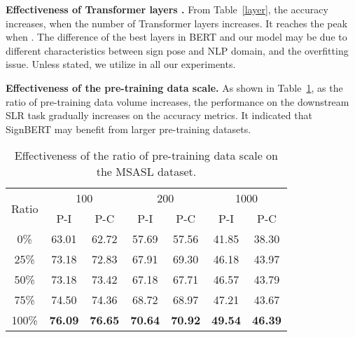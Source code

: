 \documentclass[10pt,twocolumn,letterpaper]{article}
\begin{document}
\noindent \textbf{Effectiveness of Transformer layers .}
From Table~\ref{layer}, the accuracy increases, when the number of Transformer layers increases.
It reaches the peak when .
The difference of the best layers in BERT and our model may be due to different characteristics between sign pose and NLP domain, and the overfitting issue.
Unless stated, we utilize  in all our experiments.


\noindent \textbf{Effectiveness of the pre-training data scale.}
As shown in Table~\ref{data-scale}, as the ratio of pre-training data volume increases, the performance on the downstream SLR task gradually increases on the accuracy metrics.
It indicated that SignBERT may benefit from larger pre-training datasets.


\begin{table}[t]
\small
\tabcolsep=5pt
\begin{center}
\begin{tabular}{c|cc|cc|cc}
\hline
\multicolumn{1}{c|}{\multirow{2}{*}{Ratio}} & \multicolumn{2}{c|}{100} & \multicolumn{2}{c|}{200} & \multicolumn{2}{c}{1000} \\
           & P-I & P-C & P-I   & P-C   & P-I   & P-C   \\ \hline \hline
0\%  & 63.01 & 62.72 & 57.69 & 57.56 & 41.85 & 38.30  \\
25\% & 73.18 & 72.83 & 67.91 & 69.30 & 46.18 & 43.97  \\
50\% & 73.18 & 73.42 & 67.18 & 67.71 & 46.57 & 43.79  \\
75\% & 74.50 & 74.36 & 68.72 & 68.97 & 47.21 & 43.67  \\
100\% & \textbf{76.09} & \textbf{76.65} & \textbf{70.64} & \textbf{70.92} & \textbf{49.54} & \textbf{46.39} \\ \hline   
\end{tabular}
\end{center}
\caption{Effectiveness of the ratio of pre-training data scale on the MSASL dataset.}
\label{data-scale}
\vspace{-0.2cm}
\end{table}
\end{document}
